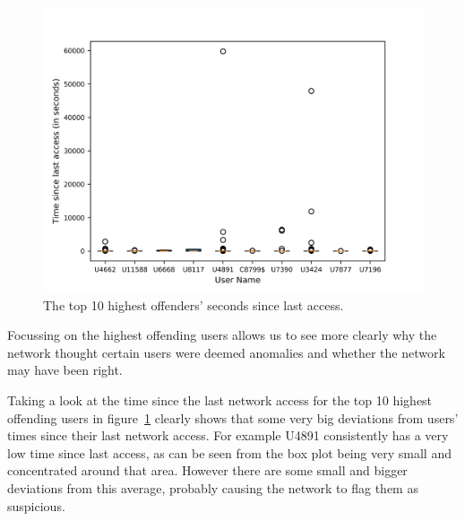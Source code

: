 \begin{figure}
	\begin{center}
		\includegraphics[scale=1.6]{evaluation/highest_offender_time_since_last_access}
	\end{center}
	\caption{The top 10 highest offenders' seconds since last access.~\label{fig:time_since_last_access}}
\end{figure}

Focussing on the highest offending users allows us to see more clearly why the network thought certain users were deemed anomalies and whether the network may have been right.

Taking a look at the time since the last network access for the top 10 highest offending users in figure~\ref{fig:time_since_last_access} clearly shows that some very big deviations from users' times since their last network access. For example U4891 consistently has a very low time since last access, as can be seen from the box plot being very small and concentrated around that area. However there are some small and bigger deviations from this average, probably causing the network to flag them as suspicious.

